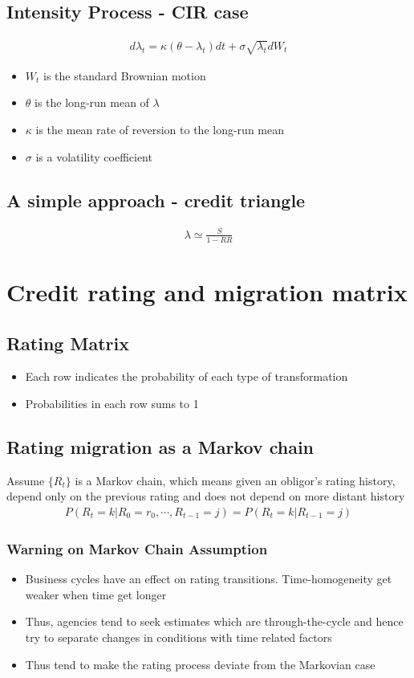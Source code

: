 \documentclass{article}
\theoremstyle{definition}
\theoremstyle{thrm}
\theoremstyle{lma}
\theoremstyle{ppst}
\theoremstyle{crlr}
\begin{document}
\subsection{Intensity Process - CIR case}
\begin{align*}
	d\lambda_t = \kappa (\theta - \lambda_t)dt + \sigma \sqrt{\lambda_t}dW_t
\end{align*}
\begin{itemize}
	\item $W_t$ is the standard Brownian motion
	\item $\theta$ is the long-run mean of $\lambda$
	\item $\kappa$ is the mean rate of reversion to the long-run mean
	\item $\sigma$ is a volatility coefficient
\end{itemize}
\subsection{A simple approach - credit triangle}
\begin{align*}
	\lambda \simeq \frac{S}{1-RR}
\end{align*}

\section{Credit rating and migration matrix}
\subsection{Rating Matrix}
\begin{itemize}
	\item Each row indicates the probability of each type of transformation 
	\item Probabilities in each row sums to 1
\end{itemize}

\subsection{Rating migration as a Markov chain}
Assume $\{R_t\}$ is a Markov chain, which means given an obligor's rating history, depend only on the previous rating and does not depend on more distant history 
\begin{align*}
	P(R_t = k|R_0 = r_0, \cdots, R_{t-1} = j) = P(R_t = k| R_{t-1} = j) 
\end{align*}
\subsubsection{Warning on Markov Chain Assumption}
\begin{itemize}
	\item Business cycles have an effect on rating transitions. Time-homogeneity get weaker when time get longer
	\item Thus, agencies tend to seek estimates which are through-the-cycle and hence try to separate changes in conditions with time related factors
	\item Thus tend to make the rating process deviate from the Markovian case
\end{itemize}
\end{document}
